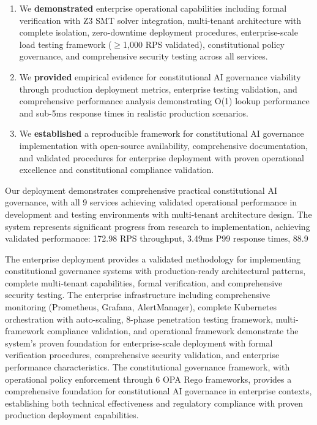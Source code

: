 \documentclass[manuscript,screen,9pt]{acmart}
\begin{document}
\begin{enumerate}[leftmargin=*,itemsep=2pt,parsep=1pt]
    \item We \textbf{demonstrated} enterprise operational capabilities including formal verification with Z3 SMT solver integration, multi-tenant architecture with complete isolation, zero-downtime deployment procedures, enterprise-scale load testing framework ($\geq$1,000 RPS validated), constitutional policy governance, and comprehensive security testing across all services.
    \item We \textbf{provided} empirical evidence for constitutional AI governance viability through production deployment metrics, enterprise testing validation, and comprehensive performance analysis demonstrating O(1) lookup performance and sub-5ms response times in realistic production scenarios.
    \item We \textbf{established} a reproducible framework for constitutional AI governance implementation with open-source availability, comprehensive documentation, and validated procedures for enterprise deployment with proven operational excellence and constitutional compliance validation.
\end{enumerate}

Our deployment demonstrates comprehensive practical constitutional AI governance, with all 9 services achieving validated operational performance in development and testing environments with multi-tenant architecture design. The system represents significant progress from research to implementation, achieving validated performance: 172.98 RPS throughput, 3.49ms P99 response times, 88.9%

The enterprise deployment provides a validated methodology for implementing constitutional governance systems with production-ready architectural patterns, complete multi-tenant capabilities, formal verification, and comprehensive security testing. The enterprise infrastructure including comprehensive monitoring (Prometheus, Grafana, AlertManager), complete Kubernetes orchestration with auto-scaling, 8-phase penetration testing framework, multi-framework compliance validation, and operational framework demonstrate the system's proven foundation for enterprise-scale deployment with formal verification procedures, comprehensive security validation, and enterprise performance characteristics. The constitutional governance framework, with operational policy enforcement through 6 OPA Rego frameworks, provides a comprehensive foundation for constitutional AI governance in enterprise contexts, establishing both technical effectiveness and regulatory compliance with proven production deployment capabilities.
\end{document}

